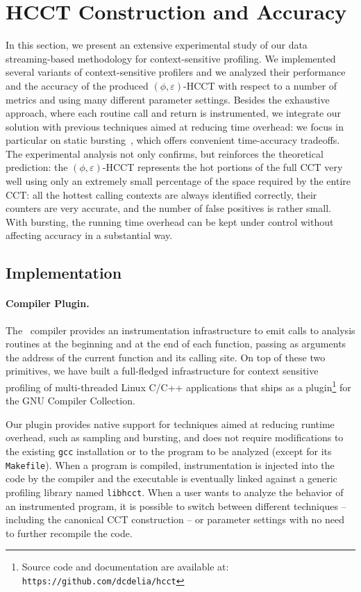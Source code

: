 \section{HCCT Construction and Accuracy}

In this section, we present an extensive experimental study of our data streaming-based methodology for context-sensitive profiling. We implemented several variants of context-sensitive profilers and we analyzed their performance and the accuracy of the produced $(\phi,\varepsilon)$-HCCT with respect to a number of metrics and using many different parameter settings. Besides the exhaustive approach, where each routine call and return is instrumented, we integrate our solution with previous techniques aimed at reducing time overhead: we focus in particular on static bursting~\cite{Zhuang06}, which offers convenient time-accuracy tradeoffs. The experimental analysis not only confirms, but reinforces the theoretical prediction: the $(\phi,\varepsilon)$-HCCT represents the hot portions of the full CCT very well using only an extremely small percentage of the space required by the entire CCT: all the hottest calling contexts are always identified correctly, their counters are very accurate, and the number of false positives is rather small. With bursting, the running time overhead can be kept under control without affecting accuracy in a substantial way.

\subsection{Implementation}

\paragraph*{Compiler Plugin.} The \gcc\ compiler provides an instrumentation infrastructure to emit calls to analysis routines at the beginning and at the end of each function, passing as arguments the address of the current function and its calling site. On top of these two primitives, we have built a full-fledged infrastructure for context sensitive profiling of multi-threaded Linux C/C++ applications that ships as a plugin\footnote{Source code and documentation are available at: \texttt{https://github.com/dcdelia/hcct}} for the GNU Compiler Collection.

Our plugin provides native support for techniques aimed at reducing runtime overhead, such as sampling and bursting, and does not require modifications to the existing {\tt gcc} installation or to the program to be analyzed (except for its {\tt Makefile}). When a program is compiled, instrumentation is injected into the code by the compiler and the executable is eventually linked against a generic profiling library named {\tt libhcct}. When a user wants to analyze the behavior of an instrumented program, it is possible to switch between different techniques -- including the canonical CCT construction -- or parameter settings with no need to further recompile the code.

